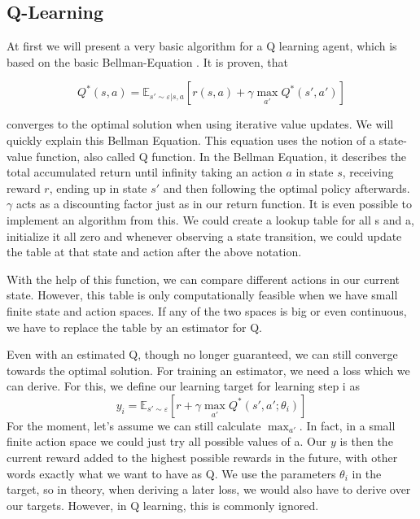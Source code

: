 \documentclass[hyperref,beleg]{cgvpub}
\begin{document}
\subsection{Q-Learning}

At first we will present a very basic algorithm for a Q learning agent, which is based on the basic Bellman-Equation \cite{bellmanTheoryDynamicProgramming1954}. It is proven, that

\begin{equation}
Q^*(s, a) = \mathbb{E}_{s' \sim \varepsilon | s,a}[r(s,a) + \gamma\max_{a'}Q^*(s', a')]
\end{equation}

converges to the optimal solution when using iterative value updates. We will quickly explain this Bellman Equation. This equation uses the notion of a state-value function, also called Q function. In the Bellman Equation, it describes the total accumulated return until infinity taking an action $a$ in state $s$, receiving reward $r$, ending up in state $s'$ and then following the optimal policy afterwards. $\gamma$ acts as a discounting factor just as in our return function. It is even possible to implement an algorithm from this. We could create a lookup table for all s and a, initialize it all zero and whenever observing a state transition, we could update the table at that state and action after the above notation.

With the help of this function, we can compare different actions in our current state. However, this table is only computationally feasible when we have small finite state and action spaces. If any of the two spaces is big or even continuous, we have to replace the table by an estimator for Q.

Even with an estimated Q, though no longer guaranteed, we can still converge towards the optimal solution. For training an estimator, we need a loss which we can derive. For this, we define our learning target for learning step i as
\begin{equation}
y_i = \mathbb{E}_{s' \sim \varepsilon}[r + \gamma \max_{a'}Q^*(s', a';\theta_{i})]
\end{equation}
For the moment, let's assume we can still calculate $\max_{a'}$. In fact, in a small finite action space we could just try all possible values of a. Our $y$ is then the current reward added to the highest possible rewards in the future, with other words exactly what we want to have as Q. We use the parameters $\theta_{i}$ in the target, so in theory, when deriving a later loss, we would also have to derive over our targets. However, in Q learning, this is commonly ignored.
\end{document}
